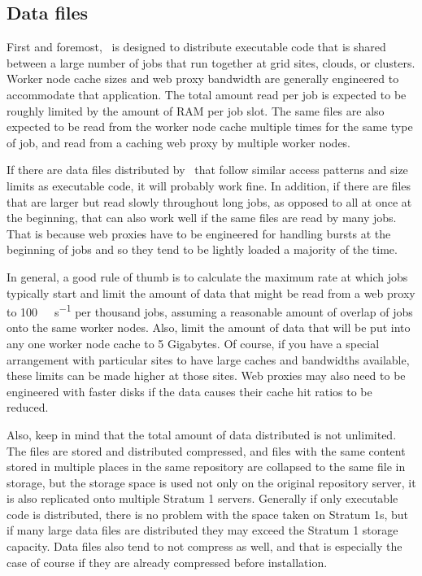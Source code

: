 \subsection{Data files}
First and foremost, \cvmfs\ is designed to distribute executable code that is shared between a large number of jobs that run together at grid sites, clouds, or clusters.
Worker node cache sizes and web proxy bandwidth are generally engineered to accommodate that application.
The total amount read per job is expected to be roughly limited by the amount of RAM per job slot.
The same files are also expected to be read from the worker node cache multiple times for the same type of job, and read from a caching web proxy by multiple worker nodes.

If there are data files distributed by \cvmfs\ that follow similar access patterns and size limits as executable code, it will probably work fine.
In addition, if there are files that are larger but read slowly throughout long jobs, as opposed to all at once at the beginning, that can also work well if the same files are read by many jobs.
That is because web proxies have to be engineered for handling bursts at the beginning of jobs and so they tend to be lightly loaded a majority of the time.

In general, a good rule of thumb is to calculate the maximum rate at which jobs typically start and limit the amount of data that might be read from a web proxy to \SI{100}{\mega\byte\per\second} per thousand jobs, assuming a reasonable amount of overlap of jobs onto the same worker nodes.
Also, limit the amount of data that will be put into any one worker node cache to 5 Gigabytes.
Of course, if you have a special arrangement with particular sites to have large caches and bandwidths available, these limits can be made higher at those sites.
Web proxies may also need to be engineered with faster disks if the data causes their cache hit ratios to be reduced.

Also, keep in mind that the total amount of data distributed is not unlimited.
The files are stored and distributed compressed, and files with the same content stored in multiple places in the same repository are collapsed to the same file in storage, but the storage space is used not only on the original repository server, it is also replicated onto multiple Stratum 1 servers. 
Generally if only executable code is distributed, there is no problem with the space taken on Stratum 1s, but if many large data files are distributed they may exceed the Stratum 1
storage capacity.
Data files also tend to not compress as well, and that is especially the case of course if they are already compressed before installation.

